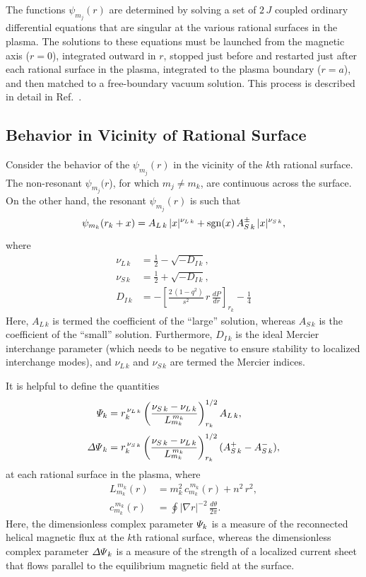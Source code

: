 \documentclass[12pt,prb,aps]{revtex4-1}
\begin{document}
The functions $\psi_{m_j}(r)$ are determined by solving a set of $2\,J$ coupled ordinary differential equations that are singular at the
various rational surfaces in the plasma. The solutions to these equations must be launched from the magnetic axis ($r=0$), integrated outward in $r$, stopped   just before and  restarted just after each rational surface in the plasma, integrated to the plasma boundary ($r=a$), and then matched to a free-boundary vacuum
solution. This process is described in detail in Ref.~. 

\subsection{Behavior in Vicinity of Rational Surface}\label{rational}
Consider the behavior of the $\psi_{m_j}(r)$ in the vicinity of the $k$th rational surface. 
The non-resonant $\psi_{m_j}(r$), for which $m_j\neq m_k$,   are continuous across the surface. On the other hand, the resonant $\psi_{m_j}(r)$ is
such that
\begin{align}\label{rat}
\psi_{m_k}(r_k+x) &= A_{L\,k}\,|x|^{\nu_{L\,k}} + {\rm sgn}(x)\,A_{S\,k}^{\pm}\,|x|^{\nu_{S\,k}},\\[0.5ex]
\end{align}
where
\begin{align}
\nu_{L\,k} &= \frac{1}{2}-\sqrt{-D_{I\,k}},\\[0.5ex]
\nu_{S\,k} &= \frac{1}{2}+\sqrt{-D_{I\,k}},\\[0.5ex]
D_{I\,k}&= - \left[\frac{2\,(1-q^2)}{s^2}\,r\,\frac{dP}{dr}\right]_{r_k} -\frac{1}{4}\label{di}
\end{align}
Here,  $A_{L\,k}$ is termed the coefficient of the ``large'' solution, whereas $A_{S\,k}$ is the coefficient of the ``small'' solution. Furthermore, $D_{I\,k}$ is the ideal
Mercier interchange parameter (which needs to be negative to ensure stability to localized interchange modes),\cite{mercier,ggj,ggj1} and $\nu_{L\,k}$ and $\nu_{S\,k}$
are termed the Mercier indices. 

It is helpful to define the quantities\,\cite{tear9}
\begin{align}\label{Psidef}
{\mit\Psi}_k&= r_k^{\,\nu_{L\,k}}\left(\frac{\nu_{S\,k}-\nu_{L\,k}}{L_{m_k}^{\,{m_k}}}\right)^{1/2}_{r_k} A_{L\,k},\\[0.5ex]
{\mit\Delta\Psi}_k &= r_k^{\,\nu_{S\,k}}\left(\frac{\nu_{S\,k}-\nu_{L\,k}}{L_{m_k}^{\,m_k}}\right)^{1/2}_{r_k} (A_{S\,k}^+-A_{S\,k}^-),\label{edpp}
\end{align}
at each rational surface in the plasma, where
\begin{align}
L_{m_k}^{\,m_k}(r) &= m_k^2\,c_{m_k}^{\,m_k}(r) + n^2\,r^2,\\[0.5ex]
c_{m_k}^{\,m_k}(r) &=\oint|\nabla r|^{-2}\,\frac{d\theta}{2\pi}.
\end{align}
 Here, the dimensionless complex parameter ${\mit\Psi}_k$ is a measure of the reconnected helical magnetic flux at the $k$th rational surface, whereas
the dimensionless complex parameter ${\mit\Delta\Psi}_k$ is a measure of the strength of a localized current sheet that flows parallel to the equilibrium magnetic field at the surface.
\end{document}
